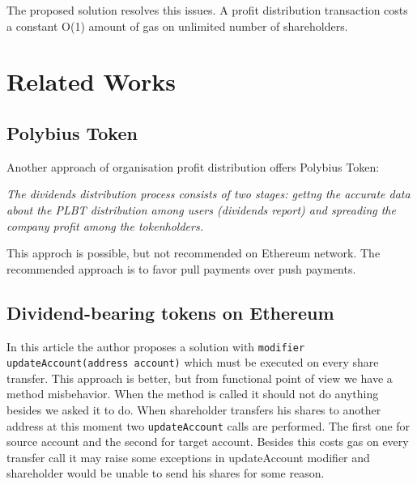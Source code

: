 \documentclass[onecolumn]{article}
\begin{document}
The proposed solution resolves this issues. A profit distribution transaction costs a constant O(1) amount of gas on unlimited number of shareholders.

\section{Related Works}
\subsection{Polybius Token}
Another approach of organisation profit distribution offers Polybius Token:\newline

\textit{The dividends distribution process consists of two stages: gettng the accurate data about the PLBT distribution among users (dividends report) and spreading the company profit among the tokenholders.} \cite{polybius}

This approch is possible, but not recommended on Ethereum network. The recommended approach is to favor pull payments over push payments.\cite{pushpoll}

\subsection{Dividend-bearing tokens on Ethereum\cite{nick}}
In this article the author proposes a solution with \lstinline{modifier updateAccount(address account)} which must be executed on every share transfer. This approach is better, but from functional point of view we have a method misbehavior. When the method is called it should not do anything besides we asked it to do. When shareholder transfers his shares to another address at this moment two \lstinline{updateAccount} calls are performed. The first one for source account and the second for target account. Besides this costs gas on every transfer call it may raise some exceptions in updateAccount modifier and shareholder would be unable to send his shares for some reason.
\end{document}
